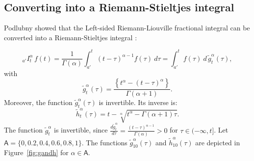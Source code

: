 \documentclass[twoside,reqno,11pt]{fcaa-var} %
\begin{document}
\subsection{Converting into a Riemann-Stieltjes integral}
Podlubny showed that the Left-sided Riemann-Liouville fractional integral can be converted into a Riemann-Stieltjes integral \cite{podlubny02}:

\begin{equation}
\label{eq:rl_to_rs}
_{a'}I_t^{\alpha}\,f(t) = \frac{1}{\Gamma(\alpha)}\int_{a'}^{t}(t-\tau)^{\alpha-1}f(\tau)~d\tau = \int_{a'}^{t} f(\tau)~d\,\widetilde{g}_t^{\alpha}(\tau), 
\end{equation}
with 
\begin{equation}
\label{eq:g_rl}
\widetilde{g}_t^{\alpha}(\tau) = \frac{\left \{t^{\alpha} - (t-\tau)^{\alpha} \right \}}{\Gamma(\alpha+1)}. 
\end{equation}
Moreover, the function $\widetilde{g}_t^{\alpha}(\tau)$ is invertible. Its inverse is:
\begin{equation}
\label{eq:h}
\widetilde{h}_t^{\alpha}(\tau) = t - \sqrt[\alpha]{t^{\alpha} - \Gamma(\alpha+1)\tau}.
\end{equation}
The function $\widetilde{g}_t^{\alpha}$ is invertible, since $\frac{d \widetilde{g}_t^{\alpha}}{d\tau}=\frac{(t-\tau)^{\alpha-1}}{\Gamma(\alpha)} > 0$ for $\tau\in(-\infty,t]$. Let $\mathsf{A} = \{0,0.2,0.4,0.6,0.8,1\}$. The functions $\widetilde{g}_{10}^{\alpha}(\tau)$ and $\widetilde{h}_{10}^{\alpha}(\tau)$ are depicted in Figure~\ref{fig:gandh} for $\alpha\in\mathsf{A}$.\\



\end{document}
